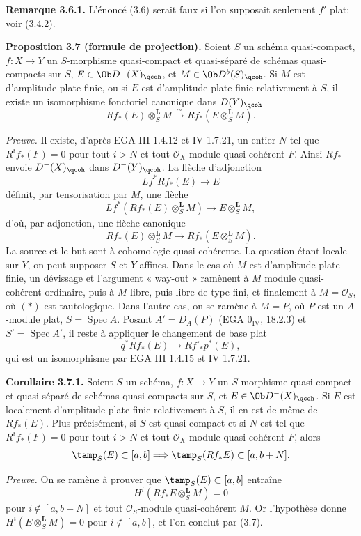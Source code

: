 \documentclass[11pt]{article}
\newcommand{\Spec}{\operatorname{Spec}}
\begin{document}
\textbf{Remarque 3.6.1.} L'énoncé (3.6) serait faux si l'on supposait seulement \(f'\) plat; voir (3.4.2).

\textbf{Proposition 3.7 (formule de projection).} Soient \(S\) un schéma quasi-compact, \(f:X\to Y\) un \(S\)-morphisme quasi-compact et quasi-séparé de schémas quasi-compacts sur \(S\), \(E\in\Ob D^{-}(X)_{\qcoh}\), et \(M\in\Ob D^b(S)_{\qcoh}\). Si \(M\) est d'amplitude plate finie, ou si \(E\) est d'amplitude plate finie relativement à \(S\), il existe un isomorphisme fonctoriel canonique dans \(D(Y)_{\qcoh}\)
\[
 Rf_*(E)\otimes_S^{\mathbf L}M
 \xrightarrow{\sim}
 Rf_*(E\otimes_S^{\mathbf L}M).
\]

\emph{Preuve.} Il existe, d'après EGA III 1.4.12 et IV 1.7.21, un entier \(N\) tel que \(R^if_*(F)=0\) pour tout \(i>N\) et tout \(\mathcal O_X\)-module quasi-cohérent \(F\). Ainsi \(Rf_*\) envoie \(D^{-}(X)_{\qcoh}\) dans \(D^{-}(Y)_{\qcoh}\). La flèche d'adjonction
\[
 Lf^*Rf_*(E)\longrightarrow E
\]
définit, par tensorisation par \(M\), une flèche
\[
 Lf^*(Rf_*(E)\otimes_S^{\mathbf L}M)
 \longrightarrow E\otimes_S^{\mathbf L}M,
\]
d'où, par adjonction, une flèche canonique
\[
 Rf_*(E)\otimes_S^{\mathbf L}M
 \longrightarrow Rf_*(E\otimes_S^{\mathbf L}M).\tag{*}
\]
La source et le but sont à cohomologie quasi-cohérente. La question étant locale sur \(Y\), on peut supposer \(S\) et \(Y\) affines. Dans le cas où \(M\) est d'amplitude plate finie, un dévissage et l'argument « way-out » ramènent à \(M\) module quasi-cohérent ordinaire, puis à \(M\) libre, puis libre de type fini, et finalement à \(M=\mathcal O_S\), où \((*)\) est tautologique. Dans l'autre cas, on se ramène à \(M=P\), où \(P\) est un \(A\)-module plat, \(S=\Spec A\). Posant \(A'=D_A(P)\) (EGA \(0_{\mathrm{IV}}\), 18.2.3) et \(S'=\Spec A'\), il reste à appliquer le changement de base plat
\[
 q^*Rf_*(E)\longrightarrow Rf'_*p^*(E),
\]
qui est un isomorphisme par EGA III 1.4.15 et IV 1.7.21.

\textbf{Corollaire 3.7.1.} Soient \(S\) un schéma, \(f:X\to Y\) un \(S\)-morphisme quasi-compact et quasi-séparé de schémas quasi-compacts sur \(S\), et \(E\in\Ob D^{-}(X)_{\qcoh}\). Si \(E\) est localement d'amplitude plate finie relativement à \(S\), il en est de même de \(Rf_*(E)\). Plus précisément, si \(S\) est quasi-compact et si \(N\) est tel que \(R^if_*(F)=0\) pour tout \(i>N\) et tout \(\mathcal O_X\)-module quasi-cohérent \(F\), alors
\[
 \tamp_S(E)\subset[a,b]
 \Longrightarrow
 \tamp_S(Rf_*E)
 \subset[a,b+N].
\]

\emph{Preuve.} On se ramène à prouver que \(\tamp_S(E)\subset[a,b]\) entraîne
\[
 H^i(Rf_*E\otimes_S^{\mathbf L}M)=0
\]
pour \(i\notin[a,b+N]\) et tout \(\mathcal O_S\)-module quasi-cohérent \(M\). Or l'hypothèse donne \(H^i(E\otimes_S^{\mathbf L}M)=0\) pour \(i\notin[a,b]\), et l'on conclut par (3.7).
\end{document}
